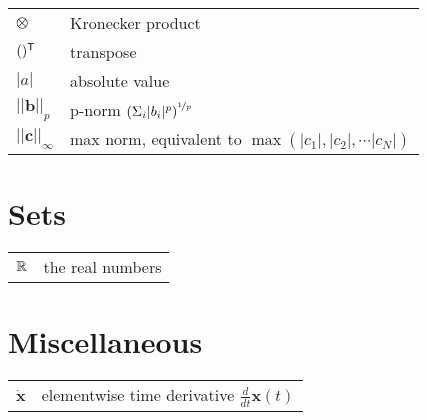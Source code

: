 \begin{tabular}{ p{2cm} l }
    $\otimes$   & Kronecker product \\
    $()^\mathsf{T}$   & transpose \\
    $|a|$       & absolute value \\
    $||\bm{b}||_p$      & p-norm $\left( \Sigma_i |b_i|^p \right)^{\nicefrac{1}{p}}$ \\
    $||\bm{c}||_{\infty}$        & max norm, equivalent to $\max(|c_1|,|c_2|, \cdots |c_N|)$ \\

\end{tabular}


\section*{Sets}
\begin{tabular}{ p{2cm} l }
    $\mathbb{R}$    & the real numbers

\end{tabular}

\section*{Miscellaneous}
\begin{tabular}{ p{2cm} l }
    $\dot{\bm{x}}$    & elementwise time derivative $\frac{d}{dt}\bm{x}(t)$ \\

\end{tabular}

